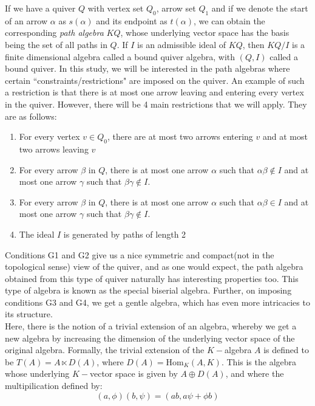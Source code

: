 \documentclass{article}
\numberwithin{figure}{section}
\begin{document}
If we have a quiver $Q$ with vertex set $Q_0$, arrow set $Q_1$ and if we denote the start of an arrow $\alpha$ as $s(\alpha)$ and its endpoint as $t(\alpha)$, we can obtain the corresponding \textit{path algebra} $KQ$, whose underlying vector space has the basis being the set of all paths in $Q$. If $I$ is an admissible ideal of $KQ$, then $KQ/I$ is a finite dimensional algebra called a bound quiver algebra, with $(Q,I)$ called a bound quiver\cite{schiffler2014quiver,assem2006elements}. In this study, we will be interested in the path algebras where certain ``constraints/restrictions" are imposed on the quiver. An example of such a restriction is that there is at most one arrow leaving and entering every vertex in the quiver. However, there will be 4 main restrictions that we will apply. They are as follows: 

\begin{enumerate}
    \item[G1)] For every vertex $v\in Q_0$, there are at most two arrows entering $v$ and at most two arrows leaving $v$
    \item[G2)] For every arrow $\beta$ in $Q$, there is at most one arrow $\alpha$ such that $\alpha\beta \notin I$ and at most one arrow $\gamma$ such that $\beta\gamma\notin I$.
    \item[G3)] For every arrow $\beta$ in $Q$, there is at most one arrow $\alpha$ such that $\alpha\beta \in I$ and at most one arrow $\gamma$ such that $\beta\gamma \notin I$.
    \item[G4)] The ideal $I$ is generated by paths of length 2 
\end{enumerate}

Conditions G1 and G2 give us a nice symmetric and compact(not in the topological sense) view of the quiver, and as one would expect, the path algebra obtained from this type of quiver naturally has interesting properties too. This type of algebra is known as the special biserial algebra. Further, on imposing conditions G3 and G4, we get a gentle algebra, which has even more intricacies to its structure. \\

Here, there is the notion of a trivial extension of an algebra, whereby we get a new algebra  by increasing the dimension of the underlying vector space of the original algebra. Formally, the trivial extension of the $K-$algebra $A$ is defined to be $T(A)=A\ltimes D(A)$, where $D(A)=\mathrm{Hom}_K(A,K)$. This is the algebra whose underlying $K-$vector space is given by $A \oplus D(A)$, and where the multipilication defined by:
\[
(a,\phi)(b,\psi)=(ab,a\psi+\phi b)
\]
\end{document}
